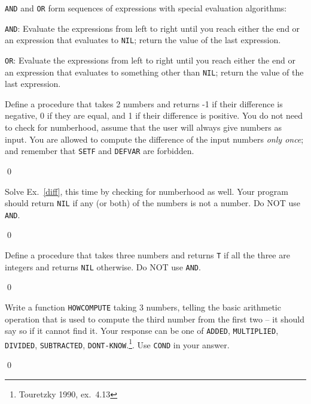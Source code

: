 \documentclass[a4paper,11pt]{article}
\begin{document}
\begin{uenum}
\item \Verb+AND+ and \Verb+OR+ form sequences of expressions with special evaluation algorithms:
\begin{uenumi}
\item \Verb+AND+: Evaluate the expressions from left to right until you reach either the end or an expression that evaluates to \Verb+NIL+; return the value of the last expression.
\item \Verb+OR+: Evaluate the expressions from left to right until you reach either the end or an expression that evaluates to something other than \Verb+NIL+; return the value of the last expression.



\end{uenumi}
\end{uenum}


\noindent\hrulefill

\begin{uexercise}
\label{diff}
Define a procedure that takes 2 numbers and returns -1 if their difference is negative, 0 if they are equal, and 1 if their difference is positive. You do not need to check for numberhood, assume that the user will always give numbers as input. You are allowed to compute the difference of the input numbers \emph{only once}; and remember that \Verb+SETF+ and \Verb+DEFVAR+ are forbidden.

\qed
\end{uexercise}

\begin{uexercise}
Solve Ex.~\ref{diff}, this time by checking for numberhood as well. Your program should return \Verb+NIL+ if any (or both) of the numbers is not a number. Do NOT use \Verb+AND+. 

\qed
\end{uexercise}

\begin{uexercise}
Define a procedure that takes three numbers and returns \Verb+T+ if all the three are integers and returns \Verb+NIL+ otherwise. Do NOT use \Verb+AND+. 

\qed
\end{uexercise}


\begin{uexercise}
Write a function \Verb+HOWCOMPUTE+ taking 3 numbers, telling the basic arithmetic operation that is used to compute the third number from the first two -- it should say so if it cannot find it. Your response can be one of \Verb+ADDED+, \Verb+MULTIPLIED+, \Verb+DIVIDED+, \Verb+SUBTRACTED+, \Verb+DONT-KNOW+.\footnote{Touretzky 1990, ex.\ 4.13}. Use \Verb+COND+ in your answer.

\qed
\end{uexercise}
\end{document}
